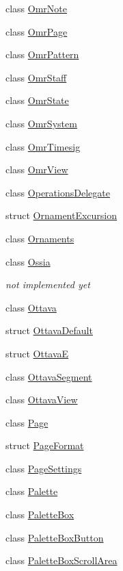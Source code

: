 \begin{DoxyCompactItemize}
class \hyperlink{class_ms_1_1_omr_note}{Omr\+Note}
\item 
class \hyperlink{class_ms_1_1_omr_page}{Omr\+Page}
\item 
class \hyperlink{class_ms_1_1_omr_pattern}{Omr\+Pattern}
\item 
class \hyperlink{class_ms_1_1_omr_staff}{Omr\+Staff}
\item 
class \hyperlink{class_ms_1_1_omr_state}{Omr\+State}
\item 
class \hyperlink{class_ms_1_1_omr_system}{Omr\+System}
\item 
class \hyperlink{class_ms_1_1_omr_timesig}{Omr\+Timesig}
\item 
class \hyperlink{class_ms_1_1_omr_view}{Omr\+View}
\item 
class \hyperlink{class_ms_1_1_operations_delegate}{Operations\+Delegate}
\item 
struct \hyperlink{struct_ms_1_1_ornament_excursion}{Ornament\+Excursion}
\item 
class \hyperlink{class_ms_1_1_ornaments}{Ornaments}
\item 
class \hyperlink{class_ms_1_1_ossia}{Ossia}
\begin{DoxyCompactList}\small\item\em not implemented yet \end{DoxyCompactList}\item 
class \hyperlink{class_ms_1_1_ottava}{Ottava}
\item 
struct \hyperlink{struct_ms_1_1_ottava_default}{Ottava\+Default}
\item 
struct \hyperlink{struct_ms_1_1_ottava_e}{OttavaE}
\item 
class \hyperlink{class_ms_1_1_ottava_segment}{Ottava\+Segment}
\item 
class \hyperlink{class_ms_1_1_ottava_view}{Ottava\+View}
\item 
class \hyperlink{class_ms_1_1_page}{Page}
\item 
struct \hyperlink{class_ms_1_1_page_format}{Page\+Format}
\item 
class \hyperlink{class_ms_1_1_page_settings}{Page\+Settings}
\item 
class \hyperlink{class_ms_1_1_palette}{Palette}
\item 
class \hyperlink{class_ms_1_1_palette_box}{Palette\+Box}
\item 
class \hyperlink{class_ms_1_1_palette_box_button}{Palette\+Box\+Button}
\item 
class \hyperlink{class_ms_1_1_palette_box_scroll_area}{Palette\+Box\+Scroll\+Area}

\end{DoxyCompactItemize}

